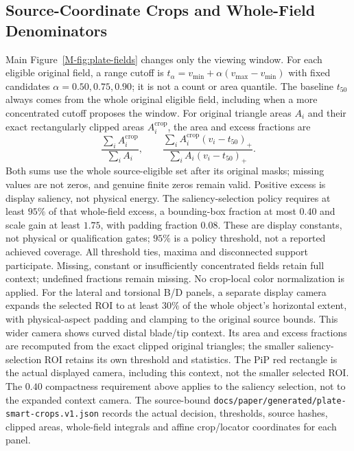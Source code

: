 \subsection{Source-Coordinate Crops and Whole-Field Denominators}
Main Figure~\ref{M-fig:plate-fields} changes only the viewing window.
For each eligible original field, a range cutoff is
$t_\alpha=v_{\min}+\alpha(v_{\max}-v_{\min})$ with fixed candidates
$\alpha=0.50,0.75,0.90$; it is not a count or area quantile.
The baseline $t_{50}$ always comes from the whole original eligible field,
including when a more concentrated cutoff proposes the window.
For original triangle areas $A_i$ and their exact rectangularly clipped
areas $A_i^{\mathrm{crop}}$, the area and excess fractions are
\begin{equation}
 \frac{\sum_i A_i^{\mathrm{crop}}}{\sum_i A_i},
 \qquad
 \frac{\sum_i A_i^{\mathrm{crop}}(v_i-t_{50})_+}
      {\sum_i A_i(v_i-t_{50})_+}.
\end{equation}
Both sums use the whole source-eligible set after its original masks;
missing values are not zeros, and genuine finite zeros remain valid.
Positive excess is display saliency, not physical energy.
The saliency-selection policy requires at least $95\%$ of that whole-field excess,
a bounding-box fraction at most $0.40$ and scale gain at least $1.75$,
with padding fraction $0.08$. These are display constants, not physical
or qualification gates; $95\%$ is a policy threshold, not a reported
achieved coverage. All threshold ties, maxima and disconnected support
participate. Missing, constant or insufficiently concentrated fields
retain full context; undefined fractions remain missing.
No crop-local color normalization is applied.
For the lateral and torsional B/D panels, a separate display camera expands
the selected ROI to at least $30\%$ of the whole object's horizontal extent,
with physical-aspect padding and clamping to the original source bounds.
This wider camera shows curved distal blade/tip context. Its area and excess
fractions are recomputed from the exact clipped original triangles; the
smaller saliency-selection ROI retains its own threshold and statistics.
The PiP red rectangle is the actual displayed camera, including this context,
not the smaller selected ROI. The $0.40$ compactness requirement above applies
to the saliency selection, not to the expanded context camera.
The source-bound \nolinkurl{docs/paper/generated/plate-smart-crops.v1.json}
records the actual decision, thresholds, source hashes, clipped areas,
whole-field integrals and affine crop/locator coordinates for each panel.

